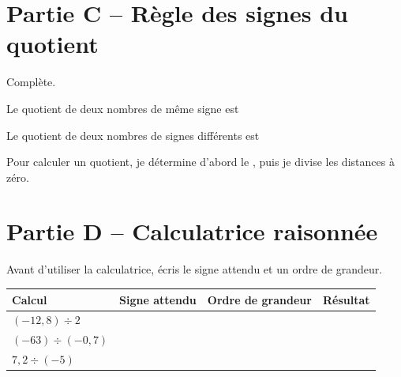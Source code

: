 \documentclass[12pt,a4paper]{article}
\begin{document}
\section*{Partie C -- Règle des signes du quotient}

Complète.

\begin{tcolorbox}[colback=SavoirC!5,colframe=SavoirC!60,boxrule=0.7pt,arc=2mm]
Le quotient de deux nombres de même signe est \dotfill

\vspace{0.4cm}

Le quotient de deux nombres de signes différents est \dotfill

\vspace{0.4cm}

Pour calculer un quotient, je détermine d'abord le \dotfill, puis je divise les distances à zéro.
\end{tcolorbox}

\section*{Partie D -- Calculatrice raisonnée}

Avant d'utiliser la calculatrice, écris le signe attendu et un ordre de grandeur.

\renewcommand{\arraystretch}{1.7}
\begin{tabularx}{\textwidth}{|>{\centering\arraybackslash}p{4cm}|>{\centering\arraybackslash}p{3cm}|>{\centering\arraybackslash}p{4cm}|>{\centering\arraybackslash}X|}
\hline
\textbf{Calcul} & \textbf{Signe attendu} & \textbf{Ordre de grandeur} & \textbf{Résultat}\\
\hline
\((-12{,}8)\div2\) & & & \\
\hline
\((-63)\div(-0{,}7)\) & & & \\
\hline
\(7{,}2\div(-5)\) & & & \\
\hline
\end{tabularx}
\end{document}
